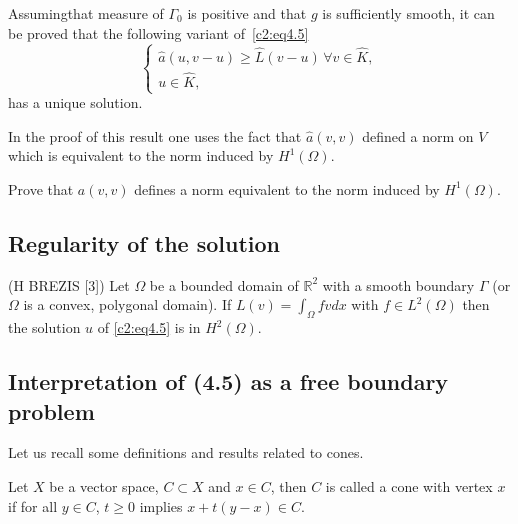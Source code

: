 Assuming\pageoriginale  that measure of $\Gamma_0$ is positive and that $g$ is
sufficiently smooth, it can be proved that the following variant 
of~\eqref{c2:eq4.5} 
\begin{equation}
\begin{cases}
\hat{a} (u, v-u) \geq \hat{L}(v-u)\, \forall  v \in \hat{K}, \\ 
u \in \hat{K}, \tag{4.12}\label{c2:eq4.12}
\end{cases}
\end{equation}
has a unique solution.

In the proof of this result one uses the fact that $\hat{a}(v, v)$
defined a norm on $V$ which is equivalent to the norm induced by $H^1
(\Omega)$. 

\begin{exercise}\label{c2:exer4.1}%
 Prove that $a(v, v)$ defines a norm equivalent to the norm induced by
 $H^1(\Omega)$. 
\end{exercise}

\subsection{Regularity of the solution}\label{c2:ss4.2}

\begin{theorem}\label{c2:thm4.2}%
 (H BREZIS [3]) Let $\Omega$ be a bounded domain of $\mathbb{R}^2$
  with a smooth boundary $\Gamma$ (or $\Omega$ is a convex, polygonal
  domain). If $L (v) = \int_\Omega fv dx$  with $f \in L^2
  (\Omega)$  then the solution $u$ of \eqref{c2:eq4.5} is in $H^2 (\Omega)$.  
\end{theorem}

\subsection{Interpretation of (4.5) as a free boundary
  problem}\label{c2:ss4.3}   

Let us recall some definitions and  results related to cones.  

\begin{definition}\label{c2:def4.1}%
 Let $X$ be a vector space, $C \subset X$ and $x \in C$, then $C$
 is called a cone with vertex $x$ if for all $y \in C$, $t \geq
 0$ implies $x + t (y-x) \in C$.  
\end{definition}

